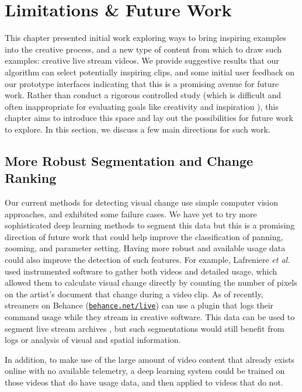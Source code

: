 \section{Limitations \& Future Work}
This chapter presented initial work exploring ways to bring inspiring examples into the creative process, and a new type of content from which to draw such examples: creative live stream videos. We provide suggestive results that our algorithm can select potentially inspiring clips, and some initial user feedback on our prototype interfaces indicating that this is a promising avenue for future work. Rather than conduct a rigorous controlled study (which is difficult and often inappropriate for evaluating goals like creativity and inspiration \cite{Shneiderman2007}), this chapter aims to introduce this space and lay out the possibilities for future work to explore. In this section, we discuss a few main directions for such work.

\subsection{More Robust Segmentation and Change Ranking}
Our current methods for detecting visual change use simple computer vision approaches, and exhibited some failure cases. We have yet to try more sophisticated deep learning methods to segment this data but this is a promising direction of future work that could help improve the classification of panning, zooming, and parameter setting. Having more robust and available usage data could also improve the detection of such features. For example, Lafreniere \textit{et al.} \cite{Lafreniere2014} used instrumented software to gather both videos and detailed usage, which allowed them to calculate visual change directly by counting the number of pixels on the artist's document that change during a video clip. As of recently, streamers on Behance (\href{https://behance.net/live}{\nolinkurl{behance.net/live}}) can use a plugin that logs their command usage while they stream in creative software. This data can be used to segment live stream archives \cite{Fraser2020}, but such segmentations would still benefit from logs or analysis of visual and spatial information.

In addition, to make use of the large amount of video content that already exists online with no available telemetry, a deep learning system could be trained on those videos that do have usage data, and then applied to videos that do not.

